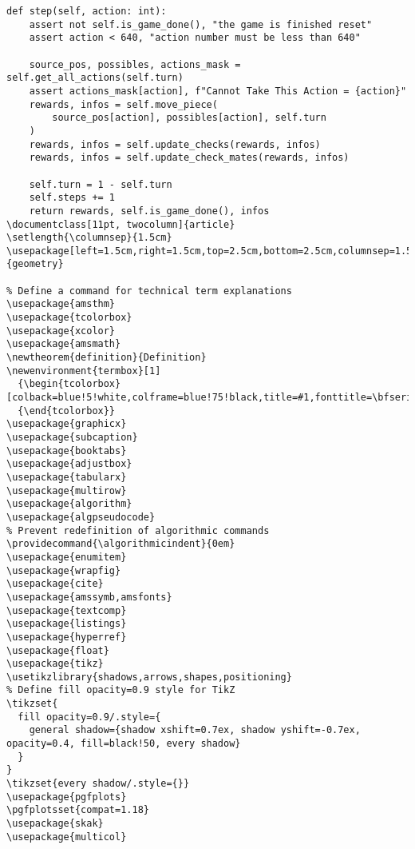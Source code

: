 \documentclass[11pt]{article}
\providecommand{\algorithmicindent}{0em}
\begin{document}
\begin{lstlisting}[style=Python]
def step(self, action: int):
    assert not self.is_game_done(), "the game is finished reset"
    assert action < 640, "action number must be less than 640"

    source_pos, possibles, actions_mask = self.get_all_actions(self.turn)
    assert actions_mask[action], f"Cannot Take This Action = {action}"
    rewards, infos = self.move_piece(
        source_pos[action], possibles[action], self.turn
    )
    rewards, infos = self.update_checks(rewards, infos)
    rewards, infos = self.update_check_mates(rewards, infos)

    self.turn = 1 - self.turn
    self.steps += 1
    return rewards, self.is_game_done(), infos
\documentclass[11pt, twocolumn]{article}
\setlength{\columnsep}{1.5cm}
\usepackage[left=1.5cm,right=1.5cm,top=2.5cm,bottom=2.5cm,columnsep=1.5cm]{geometry}

% Define a command for technical term explanations
\usepackage{amsthm}
\usepackage{tcolorbox}
\usepackage{xcolor}
\usepackage{amsmath}
\newtheorem{definition}{Definition}
\newenvironment{termbox}[1]
  {\begin{tcolorbox}[colback=blue!5!white,colframe=blue!75!black,title=#1,fonttitle=\bfseries]}
  {\end{tcolorbox}}
\usepackage{graphicx}
\usepackage{subcaption}
\usepackage{booktabs}
\usepackage{adjustbox}
\usepackage{tabularx}
\usepackage{multirow}
\usepackage{algorithm}
\usepackage{algpseudocode}
% Prevent redefinition of algorithmic commands
\providecommand{\algorithmicindent}{0em}
\usepackage{enumitem}
\usepackage{wrapfig}
\usepackage{cite}
\usepackage{amssymb,amsfonts}
\usepackage{textcomp}
\usepackage{listings}
\usepackage{hyperref}
\usepackage{float}
\usepackage{tikz}
\usetikzlibrary{shadows,arrows,shapes,positioning}
% Define fill opacity=0.9 style for TikZ
\tikzset{
  fill opacity=0.9/.style={
    general shadow={shadow xshift=0.7ex, shadow yshift=-0.7ex, opacity=0.4, fill=black!50, every shadow}
  }
}
\tikzset{every shadow/.style={}}
\usepackage{pgfplots}
\pgfplotsset{compat=1.18}
\usepackage{skak}
\usepackage{multicol}


\end{lstlisting}
\end{document}
